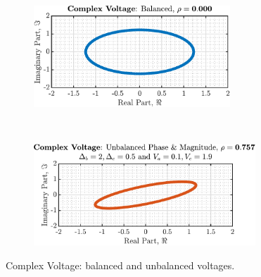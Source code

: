 \begin{enumerate}[label=\alph*), leftmargin=*]
\begin{figure}[h]
    \centering
    \begin{subfigure}{0.49\textwidth}
        \centering
        \includegraphics[height=1.5in]{report/widely-linear-filtering-and-adaptive-spectrum-estimation/complex-LMS-and-widely-linear-modelling/assets/c/balanced}
    \end{subfigure}
    ~
    \begin{subfigure}{0.49\textwidth}
        \centering
        \includegraphics[height=1.5in]{report/widely-linear-filtering-and-adaptive-spectrum-estimation/complex-LMS-and-widely-linear-modelling/assets/c/unbalanced}
    \end{subfigure}
    \caption{Complex Voltage: balanced and unbalanced voltages.}
    \label{fig:4_1_c_1}
\end{figure}


\end{enumerate}

